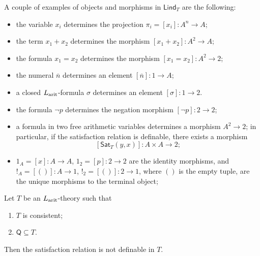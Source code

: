 \begin{example}
    A couple of examples of objects and morphisms in $\mathsf{Lind}_T$ are the following:
    \begin{itemize}
        \item the variable $x_i$ determines the projection $\pi_i=[x_i]:A^n\to A$;
        \item the term $x_1+x_2$ determines the morphism $[x_1+x_2]:A^2\to A$;
        \item the formula $x_1=x_2$ determines the morphism $[x_1=x_2]:A^2\to2$;
        \item the numeral $\overline{n}$ determines an element $[\overline{n}] : 1 \to A$;
        \item a closed $L_{\textnormal{arit}}$-formula $\sigma$ determines an element $[\sigma] : 1 \to 2$.
        \item the formula $\neg p$ determines the negation morphism $[\neg p]:2\to2$;
        \item a formula in two free arithmetic variables determines a morphism $A^2\to2$; in particular, if the satisfaction relation is definable, there exists a morphism
        \[ [\mathsf{Sat}_T(y,x)] : A\times A \to 2; \]
        \item $1_A = [x] : A \to A$, $1_2 = [p] : 2 \to 2$ are the identity morphisms, and $!_A = [()] : A \to 1$, $!_2 = [()] : 2 \to 1$, where $()$ is the empty tuple, are the unique morphisms to the terminal object;
    \end{itemize}
\end{example}

\begin{theorem}
    Let $T$ be an $L_{\textnormal{arit}}$-theory such that
    \begin{enumerate}[label=(\roman*)]
        \item $T$ is consistent;
        \item $\mathsf Q\subseteq T$.
    \end{enumerate}
    Then the satisfaction relation is not definable in $T$.
\end{theorem}

